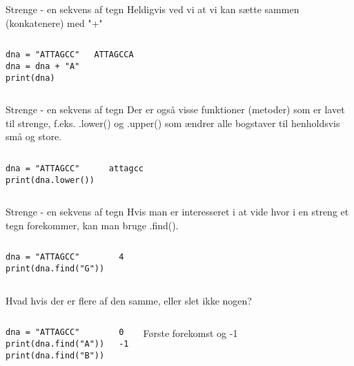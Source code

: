 \documentclass[main.tex]{subfiles}
\begin{document}
\begin{frame}[fragile]{Strenge - en sekvens af tegn}
	Heldigvis ved vi at vi kan sætte sammen (konkatenere) med "+"
		\begin{columns}
		\begin{lstlisting}[style=python]
dna = "ATTAGCC"
dna = dna + "A"
print(dna)
		\end{lstlisting}
		
		\pause
		\begin{lstlisting}[style=python]
ATTAGCCA
		\end{lstlisting}
	\end{columns}
\end{frame}


\begin{frame}[fragile]{Strenge - en sekvens af tegn}
	Der er også visse funktioner (metoder) som er lavet til strenge, f.eks. .lower() og .upper() som ændrer alle bogstaver til henholdsvis små og store.
	\begin{columns}
		\column{0.4\textwidth}
		\begin{lstlisting}[style=python]
dna = "ATTAGCC"
print(dna.lower())
		\end{lstlisting}
		
		\pause
		\column{0.4\textwidth}
		\begin{lstlisting}[style=python]
attagcc
		\end{lstlisting}
	\end{columns}
\end{frame}

\begin{frame}[fragile]{Strenge - en sekvens af tegn}
	Hvis man er interesseret i at vide hvor i en streng et tegn forekommer, kan man bruge .find().
	\begin{columns}
		\begin{lstlisting}[style=python]
dna = "ATTAGCC"
print(dna.find("G"))
		\end{lstlisting}
		
		\pause
		\begin{lstlisting}[style=python]
4
		\end{lstlisting}
	\end{columns}
	\pause
	Hvad hvis der er flere af den samme, eller slet ikke nogen?
	\begin{columns}
		\column{0.4\textwidth}
		\begin{lstlisting}[style=python]
dna = "ATTAGCC"
print(dna.find("A"))
print(dna.find("B"))
		\end{lstlisting}
		
		\pause
		\column{0.4\textwidth}
		\begin{lstlisting}[style=python]
0
-1
		\end{lstlisting}
		Første forekomst og -1
	\end{columns}
\end{frame}
\end{document}

